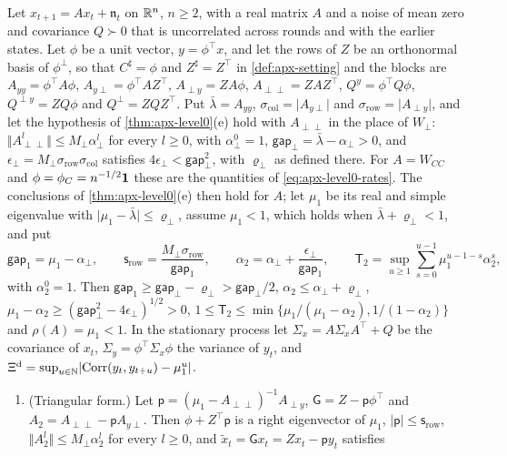 \begin{theorem}\label{thm:apx-markov-discrete}
Let $x_{t+1}=Ax_t+\mathfrak n_t$ on $\mathbb{R}^n$, $n\ge2$, with a real matrix $A$ and a noise of mean zero and covariance $Q\succ0$ that is uncorrelated across rounds and with the earlier states. Let $\phi$ be a unit vector, $y=\phi^\top x$, and let the rows of $Z$ be an orthonormal basis of $\phi^\perp$, so that $C^\sharp=\phi$ and $Z^\sharp=Z^\top$ in \cref{def:apx-setting} and the blocks are $A_{yy}=\phi^\top A\phi$, $A_{y\perp}=\phi^\top AZ^\top$, $A_{\perp y}=ZA\phi$, $A_{\perp\perp}=ZAZ^\top$, $Q^y=\phi^\top Q\phi$, $Q^{\perp y}=ZQ\phi$ and $Q^\perp=ZQZ^\top$. Put $\bar\lambda=A_{yy}$, $\sigma_{\mathrm{col}}=\lvert A_{y\perp}\rvert$ and $\sigma_{\mathrm{row}}=\lvert A_{\perp y}\rvert$, and let the hypothesis of \cref{thm:apx-level0}(e) hold with $A_{\perp\perp}$ in the place of $W_\perp$: $\Vert A_{\perp\perp}^l\Vert\le M_\perp\alpha_\perp^l$ for every $l\ge0$, with $\alpha_\perp^0=1$, $\mathsf{gap}_\perp=\bar\lambda-\alpha_\perp>0$, and $\epsilon_\perp=M_\perp\sigma_{\mathrm{row}}\sigma_{\mathrm{col}}$ satisfies $4\epsilon_\perp<\mathsf{gap}_\perp^2$, with $\varrho_\perp$ as defined there. For $A=W_{CC}$ and $\phi=\phi_C=n^{-1/2}\mathbf{1}$ these are the quantities of \eqref{eq:apx-level0-rates}. The conclusions of \cref{thm:apx-level0}(e) then hold for $A$; let $\mu_1$ be its real and simple eigenvalue with $\lvert\mu_1-\bar\lambda\rvert\le\varrho_\perp$, assume $\mu_1<1$, which holds when $\bar\lambda+\varrho_\perp<1$, and put
\begin{equation}\label{eq:apx-markov-rates}
\mathsf{gap}_1=\mu_1-\alpha_\perp,\qquad\mathsf s_{\mathrm{row}}=\frac{M_\perp\sigma_{\mathrm{row}}}{\mathsf{gap}_1},\qquad\alpha_2=\alpha_\perp+\frac{\epsilon_\perp}{\mathsf{gap}_1},\qquad\mathsf T_2=\sup_{u\ge1}\sum_{s=0}^{u-1}\mu_1^{u-1-s}\alpha_2^s ,
\end{equation}
with $\alpha_2^0=1$. Then $\mathsf{gap}_1\ge\mathsf{gap}_\perp-\varrho_\perp>\mathsf{gap}_\perp/2$, $\alpha_2\le\alpha_\perp+\varrho_\perp$, $\mu_1-\alpha_2\ge(\mathsf{gap}_\perp^2-4\epsilon_\perp)^{1/2}>0$, $1\le\mathsf T_2\le\min\{\mu_1/(\mu_1-\alpha_2),1/(1-\alpha_2)\}$ and $\rho(A)=\mu_1<1$. In the stationary process let $\Sigma_x=A\Sigma_xA^\top+Q$ be the covariance of $x_t$, $\Sigma_y=\phi^\top\Sigma_x\phi$ the variance of $y_t$, and $\Xi^{\mathrm d}=\sup_{u\in\mathbb N}\lvert\operatorname{Corr}(y_t,y_{t+u})-\mu_1^u\rvert$.
\begin{enumerate}
\item[(a)] (Triangular form.) Let $\mathsf p=(\mu_1-A_{\perp\perp})^{-1}A_{\perp y}$, $\mathsf G=Z-\mathsf p\phi^\top$ and $A_2=A_{\perp\perp}-\mathsf pA_{y\perp}$. Then $\phi+Z^\top\mathsf p$ is a right eigenvector of $\mu_1$, $\lvert\mathsf p\rvert\le\mathsf s_{\mathrm{row}}$, $\Vert A_2^l\Vert\le M_\perp\alpha_2^l$ for every $l\ge0$, and $\tilde x_t=\mathsf Gx_t=Zx_t-\mathsf py_t$ satisfies

\end{enumerate}
\end{theorem}
